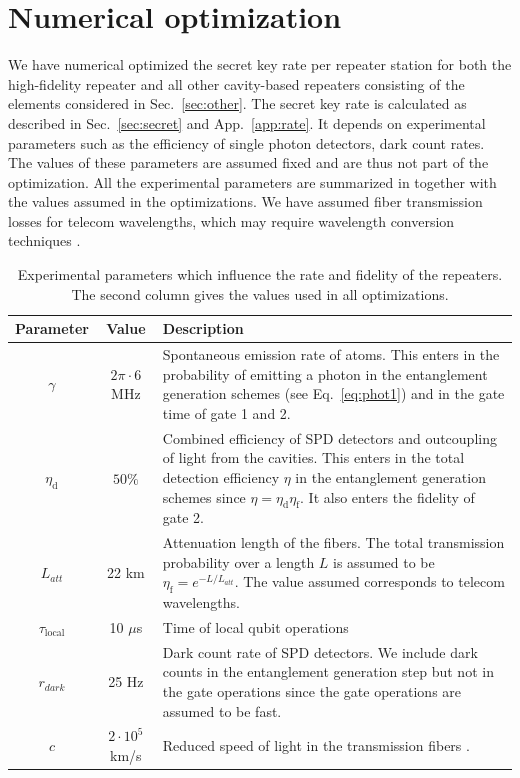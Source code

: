 \section{Numerical optimization} \label{sec:optim}
We have numerical optimized the secret key rate per repeater station for both
the high-fidelity repeater and all other cavity-based repeaters consisting of
the elements considered in Sec.~\ref{sec:other}. The secret key rate is
calculated as described in Sec.~\ref{sec:secret} and App.~\ref{app:rate}. It
depends on experimental parameters such as the efficiency of single photon
detectors, dark count rates. The values of these parameters are assumed
fixed and are thus not part of the optimization.  All the experimental
parameters are summarized in  together with the values
assumed in the optimizations. We have assumed fiber transmission losses for
telecom wavelengths, which may require wavelength conversion techniques
\cite{boris}.
{
\ssp
\begin{table}
\centering
\begin{tabular}{| c | c| p{8cm} | }
\hline
Parameter & Value & Description \\ \hline
$\gamma$ & $2\pi \cdot 6$ MHz & Spontaneous emission rate of atoms. This enters in the probability of emitting a photon in the entanglement generation schemes (see Eq.~\eqref{eq:phot1}) and in the gate time of gate 1 and 2. \\ \hline
$\eta_{\mathrm{d}}$ & $50\%$ & Combined efficiency of SPD detectors and outcoupling of light from the cavities. This enters in the total detection efficiency $\eta$ in the entanglement generation schemes since $\eta=\eta_{\mathrm{d}}\eta_{\mathrm{f}}$. It also enters the fidelity of gate 2. \\ \hline 
$L_{att}$ & 22 km  & Attenuation length of the fibers. The total transmission probability over a length $L$ is assumed to be $\eta_{\mathrm{f}}=e^{-L/L_{att}}$. The value assumed corresponds to telecom wavelengths.  \\ \hline
$\tau_{\mathrm{local}}$ & 10 $\mu$s & Time of local qubit operations  \\ \hline
$r_{dark}$ & 25 Hz & Dark count rate of SPD detectors. We include dark counts in the entanglement generation step but not in the gate operations since the gate operations are assumed to be fast.  \\ \hline
$c$ & $2\cdot 10^{5}$ km/s & Reduced speed of light in the transmission fibers \cite{sangouard3}. \\ \hline
\end{tabular}
\caption[Parameters in the numerical optimization]{Experimental parameters which
influence the rate and fidelity of the repeaters. The second column gives the
values used in all optimizations.}
\label{tab:parameter}
\end{table}
}
